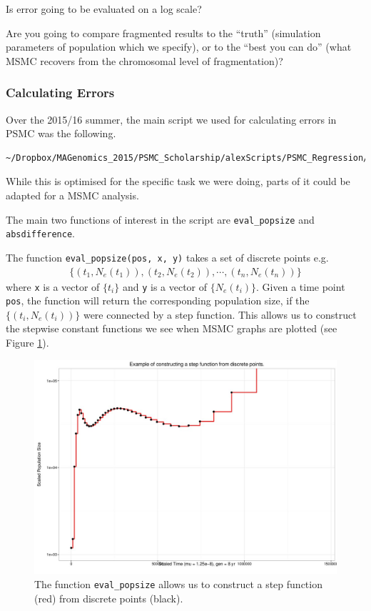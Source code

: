 \documentclass[11pt,a4paper]{article}
\begin{document}
Is error going to be evaluated on a log scale?

Are you going to compare fragmented results to the ``truth'' (simulation parameters of population which we specify), or to the ``best you can do'' (what MSMC recovers from the chromosomal level of fragmentation)?

\subsubsection{Calculating Errors}
Over the 2015/16 summer, the main script we used for calculating errors in PSMC was the following.
\begin{lstlisting}
~/Dropbox/MAGenomics_2015/PSMC_Scholarship/alexScripts/PSMC_Regression/StringExtraction_ErrorAnalysis.R
\end{lstlisting}
While this is optimised for the specific task we were doing, parts of it could be adapted for a MSMC analysis.

The main two functions of interest in the script are \texttt{eval\_popsize} and \texttt{absdifference}.

The function \texttt{eval\_popsize(pos, x, y)} takes a set of discrete points e.g. 
\begin{eqnarray*}
\{(t_1, N_{e}(t_1)), (t_2, N_{e}(t_2)), \cdots,(t_n, N_{e}(t_n))\}
\end{eqnarray*}
where \texttt{x} is a vector of $\{t_i\}$ and \texttt{y} is a vector of $\{N_e(t_i)\}$. Given a time point \texttt{pos}, the function will return the corresponding population size, if the $\{(t_i,N_e(t_i)) \}$ were connected by a step function. This allows us to construct the stepwise constant functions we see when MSMC graphs are plotted (see Figure \ref{pointsToStep}).

\begin{figure}
\centering
\includegraphics[width=1\textwidth]{pix/pointsToStep}
\caption{The function \texttt{eval\_popsize} allows us to construct a step function (red) from discrete points (black).} \label{pointsToStep}
\end{figure}
\end{document}
